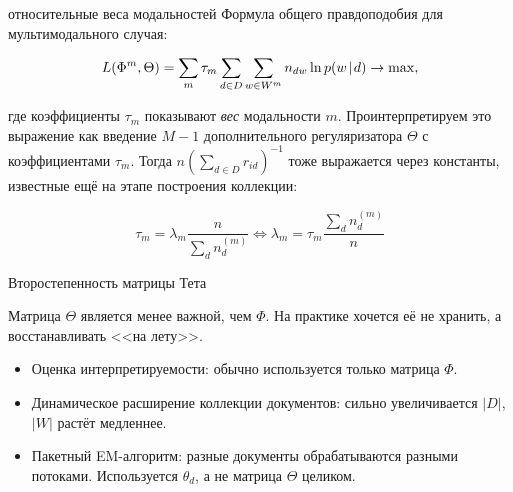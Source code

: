 \begin{frame}{относительные веса модальностей}
Формула общего правдоподобия для мультимодального случая:

\[
L(\Phi^m, \Theta) = \sum_m \tau_m \sum_{d\in D} \sum_{w \in W^m} n_{dw} \ln p(w \mspace{2mu}{|}\mspace{2mu} d) \rightarrow \max, 
\]

где коэффициенты $\tau_m$ показывают \textit{вес} модальности $m$. Проинтерпретируем это выражение как введение $M-1$ дополнительного регуляризатора $\Theta$ с коэффициентами $\tau_m$. Тогда $n(\sum_{d\in D} r_{id})^{-1}$ тоже выражается через константы, известные ещё на этапе построения коллекции:

\[
\tau_m = \lambda_m \frac{n}{\sum_d n_d^{(m)}} \iff
\lambda_m = \tau_m \frac{\sum_d n_d^{(m)}}{n}
\]

\end{frame}


\begin{frame}{Второстепенность матрицы Тета}

Матрица $\Theta$ является менее важной, чем $\Phi$. На практике хочется её не хранить, а восстанавливать <<на лету>>.

\begin{itemize}
\item Оценка интерпретируемости: обычно используется только матрица $\Phi$.

\item Динамическое расширение коллекции документов: сильно увеличивается $|D|$, $|W|$ растёт медленнее.

\item Пакетный EM-алгоритм: разные документы обрабатываются разными потоками. Используется $\theta_d$, а не матрица $\Theta$ целиком.
\end{itemize}

\end{frame}

